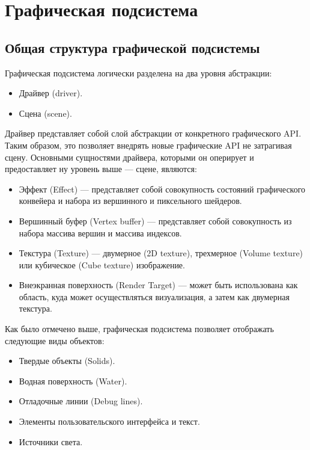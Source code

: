 \section{Графическая подсистема}

\subsection{Общая структура графической подсистемы}

Графическая подсистема логически разделена на два уровня абстракции:
\begin{itemize}
	\item	Драйвер (driver).
	\item	Сцена (scene).
\end{itemize}

Драйвер представляет собой слой абстракции от конкретного графического API.
Таким образом, это позволяет внедрять новые графические API не затрагивая сцену.
Основными сущностями драйвера, которыми он оперирует и предоставляет ну уровень выше --- сцене, являются:
\begin{itemize}
	\item	Эффект (Effect) --- представляет собой совокупность 
			состояний графического конвейера и набора из вершинного и пиксельного шейдеров.
	\item	Вершинный буфер (Vertex buffer) --- представляет собой совокупность из набора массива вершин и массива индексов.
	\item	Текстура (Texture) --- двумерное (2D texture), трехмерное (Volume texture) или кубическое (Cube texture) изображение.
	\item	Внеэкранная поверхность (Render Target) --- может быть использована 
			как область, куда может осуществляться визуализация, а затем как двумерная текстура.
\end{itemize}


Как было отмечено выше, графическая подсистема позволяет отображать следующие виды объектов:

\begin{itemize}
	\item	Твердые объекты (Solids).
	\item	Водная поверхность (Water).
	\item	Отладочные линии (Debug lines).
	\item	Элементы пользовательского интерфейса и текст.
	\item	Источники света.
\end{itemize}

